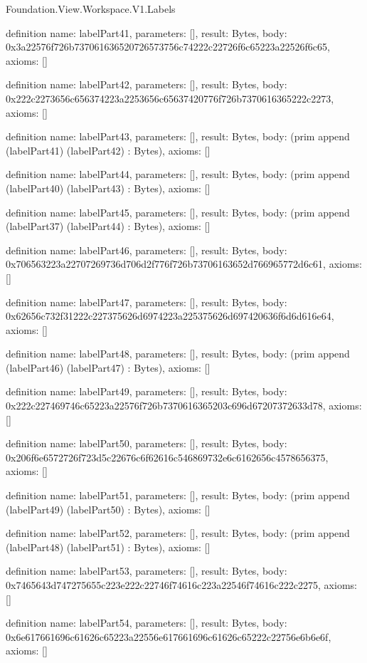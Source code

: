 \begin{lexlean}{Foundation.View.Workspace.V1.Labels}
\begin{semanticmodule}
definition{
  name: labelPart41,
  parameters: [],
  result: Bytes,
  body: 0x3a22576f726b737061636520726573756c74222c22726f6c65223a22526f6c65,
  axioms: []
}

definition{
  name: labelPart42,
  parameters: [],
  result: Bytes,
  body: 0x222c2273656c656374223a2253656c65637420776f726b7370616365222c2273,
  axioms: []
}

definition{
  name: labelPart43,
  parameters: [],
  result: Bytes,
  body: (prim append (labelPart41) (labelPart42) : Bytes),
  axioms: []
}

definition{
  name: labelPart44,
  parameters: [],
  result: Bytes,
  body: (prim append (labelPart40) (labelPart43) : Bytes),
  axioms: []
}

definition{
  name: labelPart45,
  parameters: [],
  result: Bytes,
  body: (prim append (labelPart37) (labelPart44) : Bytes),
  axioms: []
}

definition{
  name: labelPart46,
  parameters: [],
  result: Bytes,
  body: 0x706563223a22707269736d706d2f776f726b73706163652d766965772d6c61,
  axioms: []
}

definition{
  name: labelPart47,
  parameters: [],
  result: Bytes,
  body: 0x62656c732f31222c227375626d6974223a225375626d697420636f6d6d616e64,
  axioms: []
}

definition{
  name: labelPart48,
  parameters: [],
  result: Bytes,
  body: (prim append (labelPart46) (labelPart47) : Bytes),
  axioms: []
}

definition{
  name: labelPart49,
  parameters: [],
  result: Bytes,
  body: 0x222c227469746c65223a22576f726b7370616365203c696d67207372633d78,
  axioms: []
}

definition{
  name: labelPart50,
  parameters: [],
  result: Bytes,
  body: 0x206f6e6572726f723d5c22676c6f62616c546869732e6c6162656c4578656375,
  axioms: []
}

definition{
  name: labelPart51,
  parameters: [],
  result: Bytes,
  body: (prim append (labelPart49) (labelPart50) : Bytes),
  axioms: []
}

definition{
  name: labelPart52,
  parameters: [],
  result: Bytes,
  body: (prim append (labelPart48) (labelPart51) : Bytes),
  axioms: []
}

definition{
  name: labelPart53,
  parameters: [],
  result: Bytes,
  body: 0x7465643d747275655c223e222c22746f74616c223a22546f74616c222c2275,
  axioms: []
}

definition{
  name: labelPart54,
  parameters: [],
  result: Bytes,
  body: 0x6e617661696c61626c65223a22556e617661696c61626c65222c22756e6b6e6f,
  axioms: []
}


\end{semanticmodule}
\end{lexlean}
